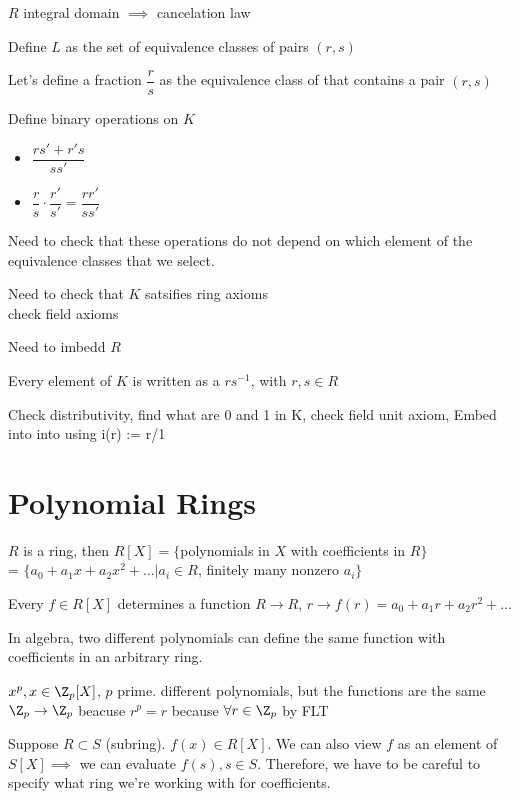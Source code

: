 \documentclass[10pt]{article}
\begin{document}
$R$ integral domain $\implies$ cancelation law

Define $L$ as the set of equivalence classes of pairs $(r, s)$

Let's define a fraction $\dfrac{r}{s}$ as the equivalence class of that contains a pair $(r, s)$

Define binary operations on $K$
\begin{itemize}
    \item $\dfrac{rs' + r's}{ss'}$
    \item $\dfrac{r}{s}\cdot \dfrac{r'}{s'} = \dfrac{rr'}{ss'}$
\end{itemize}
Need to check that these operations do not depend on which element of the equivalence classes that we select. 

Need to check that $K$ satsifies ring axioms\\
check field axioms

Need to imbedd $R$

Every element of $K$ is written as a $rs^{-1}$, with $r,s \in R$

Check distributivity, find what are 0 and 1 in K, check field unit axiom, Embed into into using i(r) := r/1

\section{Polynomial Rings}
\begin{defn}
    $R$ is a ring, then $R[X] = \{$polynomials in $X$ with coefficients in $R\}$\\
    = $\{a_0 + a_1x + a_2x^2 + \ldots | a_i \in R$, finitely many nonzero $a_i\}$
\end{defn}

Every $f\in R[X]$ determines a function $R\to R$, $r \to f(r) = a_0 + a_1r + a_2r^2 + \ldots$

\begin{rmk}
    In algebra, two different polynomials can define the same function with coefficients in an arbitrary ring.
\end{rmk}

$x^p, x \in \Z_p[X]$, $p$ prime. different polynomials, but the functions are the same $\Z_p \to \Z_p$ beacuse $r^p = r$ because $\forall r \in \Z_p$ by FLT

Suppose $R \subset S$ (subring). $f(x) \in R[X]$. We can also view $f$ as an element of $S[X] \implies $ we can evaluate $f(s), s\in S$. Therefore, we have to be careful to specify what ring we're working with for coefficients.
\end{document}
